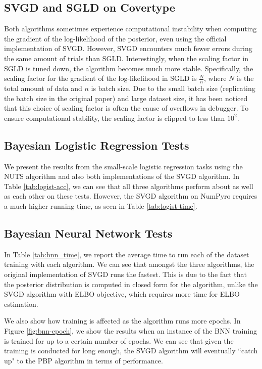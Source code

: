 \subsection{SVGD and SGLD on Covertype}
Both algorithms sometimes experience computational instability when computing the gradient of the log-likelihood of the posterior, even using the official implementation of SVGD. However, SVGD encounters much fewer errors during the same amount of trials than SGLD. Interestingly, when the scaling factor in SGLD is tuned down, the algorithm becomes much more stable. Specifically, the scaling factor for the gradient of the log-likelihood in SGLD is $\frac{N}{n}$, where $N$ is the total amount of data and $n$ is batch size. Due to the small batch size (replicating the batch size in the original paper) and large dataset size, it has been noticed that this choice of scaling factor is often the cause of overflows in debugger. To ensure computational stability, the scaling factor is clipped to less than $10^2$.

\subsection{Bayesian Logistic Regression Tests}\label{ssect:bylog-data}

We present the results from the small-scale logistic regression tasks using the NUTS algorithm and also both implementations of the SVGD algorithm. In Table \ref{tab:logist-acc}, we can see that all three algorithms perform about as well as each other on these tests. However, the SVGD algorithm on NumPyro requires a much higher running time, as seen in Table \ref{tab:logist-time}. 



\subsection{Bayesian Neural Network Tests}\label{ssect:bnn-time}

In Table \ref{tab:bnn_time}, we report the average time to run each of the dataset training with each algorithm. We can see that amongst the three algorithms, the original implementation of SVGD runs the fastest. This is due to the fact that the posterior distribution is computed in closed form for the algorithm, unlike the SVGD algorithm with ELBO objective, which requires more time for ELBO estimation.



\label{ssect:bnn-epoch}

We also show how training is affected as the algorithm runs more epochs. In Figure \ref{fig:bnn-epoch}, we show the results when an instance of the BNN training is trained for up to a certain number of epochs. We can see that given the training is conducted for long enough, the SVGD algorithm will eventually ``catch up" to the PBP algorithm in terms of performance.

